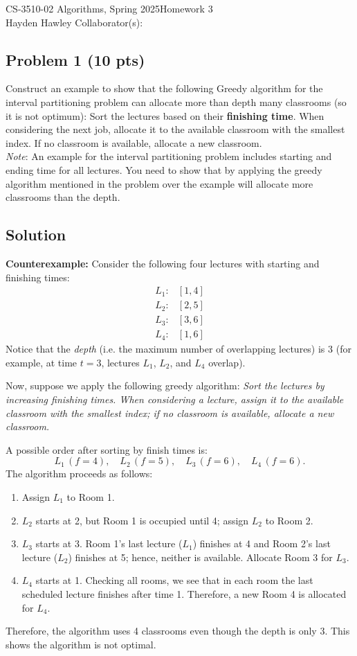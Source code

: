 \documentclass[12pt]{article}
\begin{document}
\noindent CS-3510-02 Algorithms, Spring 2025\hfill Homework 3\\
Hayden Hawley \hfill Collaborator(s):

\hrulefill

\subsection*{Problem 1 (10 pts)}
Construct an example to show that the following Greedy algorithm for the interval partitioning problem can allocate more than depth many classrooms (so it is not optimum): Sort the lectures based on their \textbf{finishing time}. When considering the next job, allocate it to the available classroom with the smallest index. If no classroom is available, allocate a new classroom. \\
\noindent \textit{Note}: An example for the interval partitioning problem includes starting and ending time for all lectures. You need to show that by applying the greedy algorithm mentioned in the problem over the example will allocate more classrooms than the depth.

\subsection*{Solution}
\textbf{Counterexample:} Consider the following four lectures with starting and finishing times:
\[
\begin{array}{ll}
L_1: & [1,4] \\
L_2: & [2,5] \\
L_3: & [3,6] \\
L_4: & [1,6]
\end{array}
\]
Notice that the \emph{depth} (i.e. the maximum number of overlapping lectures) is 3 (for example, at time \(t=3\), lectures \(L_1\), \(L_2\), and \(L_4\) overlap).

Now, suppose we apply the following greedy algorithm: \emph{Sort the lectures by increasing finishing times. When considering a lecture, assign it to the available classroom with the smallest index; if no classroom is available, allocate a new classroom.}

A possible order after sorting by finish times is:
\[
L_1 \,(f=4), \quad L_2 \,(f=5), \quad L_3 \,(f=6), \quad L_4 \,(f=6).
\]
The algorithm proceeds as follows:
\begin{enumerate}
    \item Assign \(L_1\) to Room 1.
    \item \(L_2\) starts at 2, but Room 1 is occupied until 4; assign \(L_2\) to Room 2.
    \item \(L_3\) starts at 3. Room 1's last lecture (\(L_1\)) finishes at 4 and Room 2's last lecture (\(L_2\)) finishes at 5; hence, neither is available. Allocate Room 3 for \(L_3\).
    \item \(L_4\) starts at 1. Checking all rooms, we see that in each room the last scheduled lecture finishes after time 1. Therefore, a new Room 4 is allocated for \(L_4\).
\end{enumerate}
Therefore, the algorithm uses 4 classrooms even though the depth is only 3. This shows the algorithm is not optimal.
\end{document}
